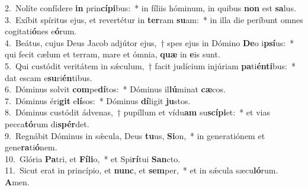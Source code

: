{2.~}Nolíte confídere \textbf{in} prin\textbf{cí}\textbf{pi}bus:~* in fíliis hóminum, in quibus \textbf{non} est \textbf{sa}lus.\\
{3.~}Exíbit spíritus ejus, et revertétur in \textbf{ter}ram \textbf{su}am:~* in illa die períbunt omnes cogitati\textbf{ó}nes e\textbf{ó}rum.\\
{4.~}Beátus, cujus Deus Jacob adjútor ejus,~† spes ejus in Dómino \textbf{De}o i\textbf{psí}us:~* qui fecit cælum et terram, mare et ómnia, \textbf{quæ} in \textbf{e}is sunt.\\
{5.~}Qui custódit veritátem in sǽculum,~† facit judícium injúriam \textbf{pa}ti\textbf{én}\textbf{ti}bus:~* dat escam e\textbf{su}ri\textbf{én}tibus.\\
{6.~}Dóminus solvit \textbf{com}pe\textbf{dí}tos:~* Dóminus il\textbf{lú}minat \textbf{cæ}cos.\\
{7.~}Dóminus éri\textbf{git} e\textbf{lí}sos:~* Dóminus \textbf{dí}ligit \textbf{ju}stos.\\
{8.~}Dóminus custódit ádvenas,~† pupíllum et vídu\textbf{am} su\textbf{scí}\textbf{pi}et:~* et vias pecca\textbf{tó}rum di\textbf{spér}det.\\
{9.~}Regnábit Dóminus in sǽcula, Deus \textbf{tu}us, \textbf{Si}on,~* in generatiónem et gene\textbf{ra}ti\textbf{ó}nem.\\
{10.~}Glória \textbf{Pa}tri, et \textbf{Fí}\textbf{li}o,~* et Spi\textbf{rí}tui \textbf{San}cto.\\
{11.~}Sicut erat in princípio, et \textbf{nunc}, et \textbf{sem}per,~* et in sǽcula sæcu\textbf{ló}rum. \textbf{A}men.\\
